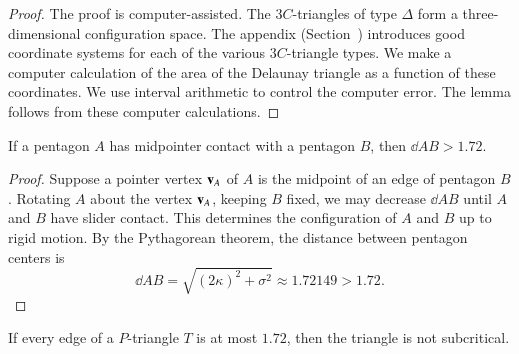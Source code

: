 \begin{proof} The proof is computer-assisted.  The $3C$-triangles of
  type $\Delta$ form a three-dimensional configuration space.  The
  appendix (Section~) introduces good coordinate
  systems for each of the various $3C$-triangle types.  We make a
  computer calculation of the area of the Delaunay triangle as a
  function of these coordinates.  We use interval arithmetic to
  control the computer error.  The lemma follows from these computer
  calculations.
\end{proof}



\begin{lemma}  
  If a pentagon $A$ has midpointer contact with a pentagon $B$, then
  $\dd{A}{B} > 1.72$.
\end{lemma}

\begin{proof} Suppose a pointer vertex ${\mathbf v}_A$ of $A$ is the midpoint of an
  edge of pentagon $B$.  Rotating $A$ about the vertex ${\mathbf v}_A$, keeping
  $B$ fixed, we may decrease $\dd{A}{B}$ until $A$ and $B$
  have slider contact.  This determines the configuration of $A$ and
  $B$ up to rigid motion.  By the Pythagorean theorem, the
  distance between pentagon centers is
\[
\dd{A}{B} = \sqrt{(2\kappa)^2 + \sigma^2} \approx 1.72149 > 1.72.
\] %
\end{proof}

\begin{lemma}
  If every edge of a $P$-triangle $T$ is at most $1.72$, then the
  triangle is not subcritical.
\end{lemma}

